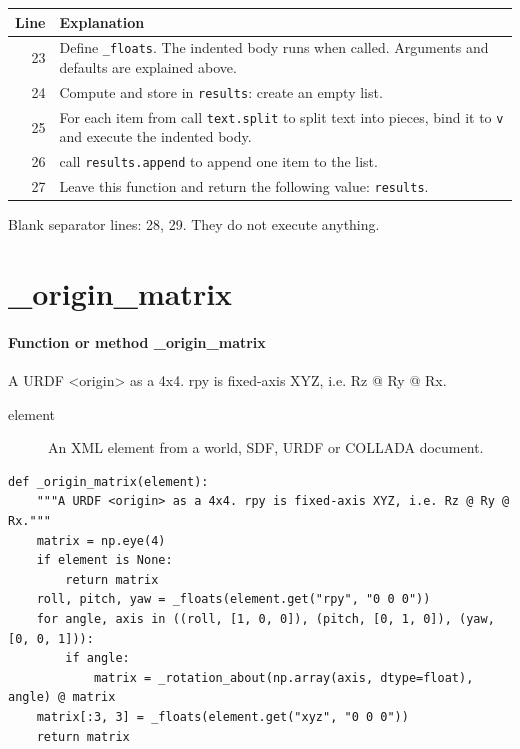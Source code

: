 \documentclass[11pt,a4paper]{book}
\begin{document}
\begin{longtable}{r p{}}

\textbf{Line} & \textbf{Explanation} \\ \hline \endhead

23 & Define \texttt{\_floats}. The indented body runs when called. Arguments and defaults are explained above. \\

24 & Compute and store in \texttt{results}: create an empty list.  \\

25 & For each item from call \texttt{text.split} to split text into pieces, bind it to \texttt{v} and execute the indented body. \\

26 & call \texttt{results.append} to append one item to the list. \\

27 & Leave this function and return the following value: \texttt{results}. \\

\end{longtable}

Blank separator lines: 28, 29. They do not execute anything.

\section{\_origin\_matrix}

\paragraph{Function or method \_origin\_matrix}
A URDF <origin> as a 4x4. rpy is fixed-axis XYZ, i.e. Rz @ Ry @ Rx.

\begin{description}
\item[element] An XML element from a world, SDF, URDF or COLLADA document.
\end{description}

\begin{lstlisting}[firstnumber=30]
def _origin_matrix(element):
    """A URDF <origin> as a 4x4. rpy is fixed-axis XYZ, i.e. Rz @ Ry @ Rx."""
    matrix = np.eye(4)
    if element is None:
        return matrix
    roll, pitch, yaw = _floats(element.get("rpy", "0 0 0"))
    for angle, axis in ((roll, [1, 0, 0]), (pitch, [0, 1, 0]), (yaw, [0, 0, 1])):
        if angle:
            matrix = _rotation_about(np.array(axis, dtype=float), angle) @ matrix
    matrix[:3, 3] = _floats(element.get("xyz", "0 0 0"))
    return matrix


\end{lstlisting}
\end{document}
